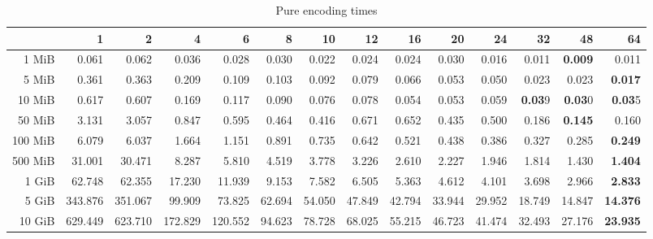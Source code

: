 \begin{table}[!h]
	\centering
	\caption{Pure encoding times}
	\begin{tabular}{rrrrrrrrrrrrrr}
		\toprule
		\diagbox[width=7em]{Size}{Threads}  &      1  &      2  &      4  &      6  &     8  &     10 &     12 &     16 &     20 &     24 &     32 &     48 &     64 \\
		\midrule
		1 MiB   &   0.061 &   0.062 &   0.036 &   0.028 &  0.030 &  0.022 &  0.024 &  0.024 &  0.030 &  0.016 &  0.011 &  \textbf{0.009} &  0.011 \\
		5 MiB   &   0.361 &   0.363 &   0.209 &   0.109 &  0.103 &  0.092 &  0.079 &  0.066 &  0.053 &  0.050 &  0.023 &  0.023 &  \textbf{0.017} \\
		10 MiB  &   0.617 &   0.607 &   0.169 &   0.117 &  0.090 &  0.076 &  0.078 &  0.054 &  0.053 &  0.059 &  \textbf{0.03}9 &  \textbf{0.03}0 &  \textbf{0.03}5 \\
		50 MiB  &   3.131 &   3.057 &   0.847 &   0.595 &  0.464 &  0.416 &  0.671 &  0.652 &  0.435 &  0.500 &  0.186 &  \textbf{0.145} &  0.160 \\
		100 MiB &   6.079 &   6.037 &   1.664 &   1.151 &  0.891 &  0.735 &  0.642 &  0.521 &  0.438 &  0.386 &  0.327 &  0.285 &  \textbf{0.249} \\
		500 MiB &  31.001 &  30.471 &   8.287 &   5.810 &  4.519 &  3.778 &  3.226 &  2.610 &  2.227 &  1.946 &  1.814 &  1.430 &  \textbf{1.404} \\
		1 GiB   &  62.748 &  62.355 &  17.230 &  11.939 &  9.153 &  7.582 &  6.505 &  5.363 &  4.612 &  4.101 &  3.698 &  2.966 &  \textbf{2.833} \\
		5 GiB   & 343.876 & 351.067 &  99.909 &  73.825 & 62.694 & 54.050 & 47.849 & 42.794 & 33.944 & 29.952 & 18.749 & 14.847 & \textbf{14.376} \\
		10 GiB  & 629.449 & 623.710 & 172.829 & 120.552 & 94.623 & 78.728 & 68.025 & 55.215 & 46.723 & 41.474 & 32.493 & 27.176 & \textbf{23.935} \\
		\bottomrule
	\end{tabular}
\end{table}

